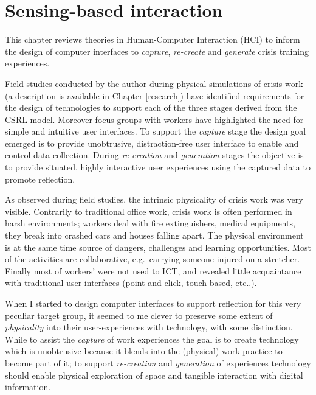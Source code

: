 \chapter{Sensing-based interaction}\label{interaction}


This chapter reviews theories in Human-Computer Interaction (HCI) to inform the design of computer interfaces to \emph{capture}, \emph{re-create} and \emph{generate} crisis training experiences.

Field studies conducted by the author during physical simulations of crisis work (a description is available in Chapter \ref{research}) have identified requirements for the design of technologies to support each of the three stages derived from the CSRL model. Moreover focus groups with workers have highlighted the need for simple and intuitive user interfaces. To support the \emph{capture} stage the design goal emerged is to provide unobtrusive, distraction-free user interface to enable and control data collection. During \emph{re-creation} and \emph{generation} stages the objective is to provide situated, highly interactive user experiences using the captured data to promote reflection.

As observed during field studies, the intrinsic physicality of crisis work was very visible. Contrarily to traditional office work, crisis work is often performed in harsh environments; workers deal with fire extinguishers, medical equipments, they break into crashed cars and houses falling apart. The physical environment is at the same time source of dangers, challenges and learning opportunities. Most of the activities are collaborative, e.g.~carrying someone injured on a stretcher. Finally most of workers' were not used to ICT, and revealed little acquaintance with traditional user interfaces (point-and-click, touch-based, etc..).

When I started to design computer interfaces to support reflection for this very peculiar target group, it seemed to me clever to preserve some extent of \emph{physicality} into their user-experiences with technology, with some distinction. While to assist the \emph{capture} of work experiences the goal is to create technology which is unobtrusive because it blends into the (physical) work practice to become part of it; to support \emph{re-creation} and \emph{generation} of experiences technology should enable physical exploration of space and tangible interaction with digital information.

